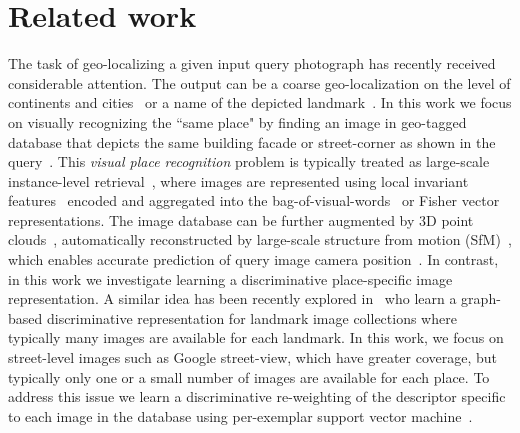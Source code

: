 \section{Related work} 
\label{sec:related}

                       
                       
    
		\textcolor{petr}{
	The task of geo-localizing a given input query photograph has recently received considerable attention.  
	  The output can be a coarse geo-localization on the level of continents and cities~\cite{Doersch12,Hays2008,Kalogerakis09} or a name of the depicted landmark~\cite{Li09}.  In this work we focus on visually recognizing the ``same place" by finding an image in geo-tagged database that depicts the same building facade or street-corner as shown in the query~\cite{Chen11,Cummins09,Knopp2010,Schindler07,Torii2013,Zamir10}.}  	  
    This {\em visual place recognition} problem is typically treated as large-scale instance-level retrieval~\cite{Cummins09,Chen11,Knopp2010,Schindler07,Torii2013,Zamir10}, where images are represented using local invariant features~\cite{Lowe04} encoded and aggregated into the bag-of-visual-words~\cite{Csurka04,Sivic03} or Fisher vector~\cite{Jegou12} representations. 
    The image database can be further augmented by 3D point clouds~\cite{Klinger13}, automatically
    reconstructed by large-scale structure from motion
    (SfM)~\cite{Agarwal-ICCV-2009,Klinger13}, which enables accurate prediction of query image camera position~\cite{Li12,Sattler12}.
    In contrast, in this work we investigate learning a discriminative place-specific image representation. A similar idea has been recently explored in~\cite{Cao13} 
    who learn a graph-based discriminative representation for landmark image collections where typically many images are available for each landmark.
    In this work, we focus on street-level images such as Google street-view, which have greater coverage, but typically only one or a small number of images are  available for each place.  To address this issue we learn a discriminative re-weighting of the descriptor specific to each image in the database using per-exemplar support vector machine~\cite{Malisiewicz11}.
    

